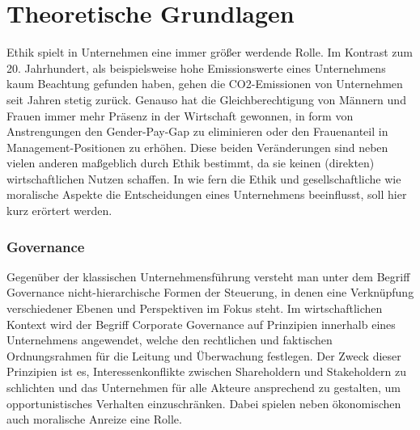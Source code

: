 \documentclass[12pt]{article}
\begin{document}
\renewcommand{\mytitle}{Governanceethik und\\moralische Anreize}%
\renewcommand{\myauthor}{Lennart Schulte-Kellinghaus,\\Timo Stovermann}%
\renewcommand{\headheight}{27pt}%



\frontmatter%


\printabbreviations%
\clearpage
\renewcommand{\plaintitle}{Abbildungsverzeichnis}
{\def\makebox[#1][#2]#3{#3}%
\listoffigures
}
\clearpage
\renewcommand{\plaintitle}{Tabellenverzeichnis}
{\def\makebox[#1][#2]#3{#3}%
\listoftables
}
\clearpage
\renewcommand{\plaintitle}{Inhaltsverzeichnis}%
{\def\makebox[#1][#2]#3{#3}%
	\tableofcontents
}


\clearpage
\mainmatter%

\part{Theoretische Grundlagen}
Ethik spielt in Unternehmen eine immer größer werdende Rolle. Im Kontrast zum 20. Jahrhundert, als beispielsweise hohe Emissionswerte eines Unternehmens kaum Beachtung gefunden haben, gehen die CO2-Emissionen von Unternehmen seit Jahren stetig zurück. Genauso hat die Gleichberechtigung von Männern und Frauen immer mehr Präsenz in der Wirtschaft gewonnen, in form von Anstrengungen den Gender-Pay-Gap zu eliminieren oder den Frauenanteil in Management-Positionen zu erhöhen. Diese beiden Veränderungen sind neben vielen anderen maßgeblich durch Ethik bestimmt, da sie keinen (direkten) wirtschaftlichen Nutzen schaffen. In wie fern die Ethik und gesellschaftliche wie moralische Aspekte die Entscheidungen eines Unternehmens beeinflusst, soll hier kurz erörtert werden.
\section{Governance}
Gegenüber der klassischen Unternehmensführung versteht man unter dem Begriff Governance nicht-hierarchische Formen der Steuerung, in denen eine Verknüpfung verschiedener Ebenen und Perspektiven im Fokus steht. Im wirtschaftlichen Kontext wird der Begriff Corporate Governance auf Prinzipien innerhalb eines Unternehmens angewendet, welche den rechtlichen und faktischen Ordnungsrahmen für die Leitung und Überwachung festlegen. Der Zweck dieser Prinzipien ist es, Interessenkonflikte zwischen Shareholdern und Stakeholdern zu schlichten und das Unternehmen für alle Akteure ansprechend zu gestalten, um opportunistisches Verhalten einzuschränken. Dabei spielen neben ökonomischen auch moralische Anreize eine Rolle.
\end{document}
